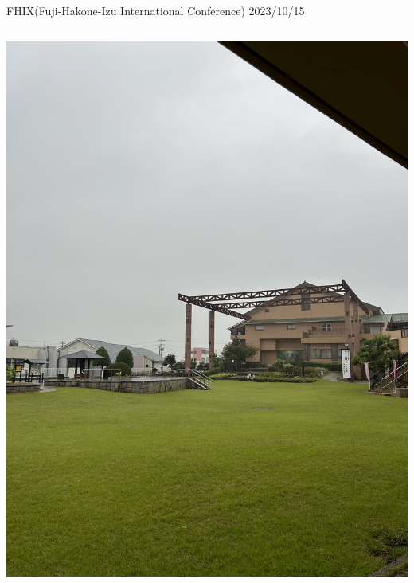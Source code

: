 \documentclass[dvipdfmx, unicode, 169]{beamer}
\begin{document}
\begin{frame}{FHIX(Fuji-Hakone-Izu International Conference) 2023/10/15}
\begin{columns}[T]
\begin{column}{0.5\linewidth}
      \includegraphics[scale=0.04]{img/ActiveReport/20231015.png}
    \end{column}
  \end{columns}
\end{frame}
\end{document}
